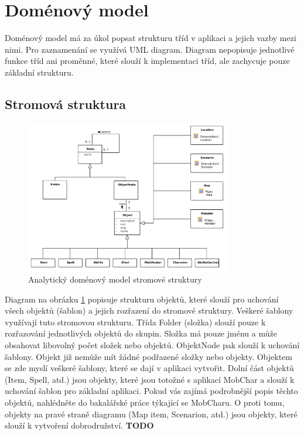 \documentclass[thesis=B,czech]{resources/FITthesis}[2012/06/26]
\begin{document}
	\section{Doménový model}
Doménový model má za úkol popsat strukturu tříd v aplikaci a jejich vazby mezi nimi. Pro zaznamenání se využívá UML diagram. Diagram nepopisuje jednotlivé funkce tříd ani proměnné, které slouží k implementaci tříd, ale zachycuje pouze základní strukturu.
\subsection{Stromová struktura}
\begin{figure}\centering
	\includegraphics[width=0.8\textwidth]{images/domain_struktura}
	\caption[Analytický doménový model stromové struktury]{Analytický doménový model stromové struktury}\label{fig:dm_stromova_struktura}
\end{figure}
Diagram na obrázku \ref{fig:dm_stromova_struktura} popisuje strukturu objektů, které slouží pro uchování všech objektů (šablon) a jejich rozřazení do stromové struktury. Veškeré šablony využívají tuto stromovou strukturu. Třída Folder (složka) slouží pouze k rozřazování jednotlivých objektů do skupin. Složka má pouze jménu a může obsahovat libovolný počet složek nebo objektů. ObjektNode pak slouží k uchování šablony. Objekt již nemůže mít žádné podřazené složky nebo objekty. Objektem se zde myslí veškeré šablony, které se dají v aplikaci vytvořit. Dolní část objektů (Item, Spell, atd.) jsou objekty, které jsou totožné s aplikací MobChar a slouží k uchování šablon pro základní aplikaci. Pokud vás zajímá podrobnější popis těchto objektů, nahlédněte do bakalářské práce týkající se MobCharu. O proti tomu, objekty na pravé straně diagramu (Map item, Scenarion, atd.) jsou objekty, které slouží k vytvoření dobrodružství. \textbf{TODO} %
\end{document}
